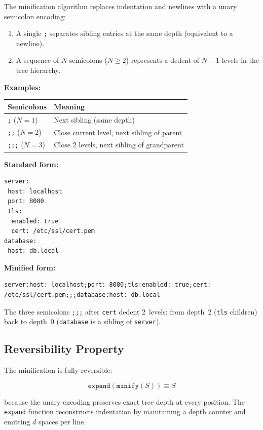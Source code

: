\documentclass[11pt, a4paper]{article}
\begin{document}
\noindent The minification algorithm replaces indentation and newlines with a
unary semicolon encoding:

\begin{enumerate}
\item A single \texttt{;} separates sibling entries at the same depth
      (equivalent to a newline).
\item A sequence of $N$ semicolons ($N \geq 2$) represents a dedent of
      $N-1$ levels in the tree hierarchy.
\end{enumerate}

\noindent \textbf{Examples:}

\begin{tabular}{ll}
\toprule
Semicolons & Meaning \\
\midrule
\texttt{;} ($N{=}1$)  & Next sibling (same depth) \\
\texttt{;;} ($N{=}2$) & Close current level, next sibling of parent \\
\texttt{;;;} ($N{=}3$) & Close 2 levels, next sibling of grandparent \\
\bottomrule
\end{tabular}

\medskip
\noindent \textbf{Standard form:}
\begin{lstlisting}[style=scon]
server:
 host: localhost
 port: 8080
 tls:
  enabled: true
  cert: /etc/ssl/cert.pem
database:
 host: db.local
\end{lstlisting}

\noindent \textbf{Minified form:}
\begin{lstlisting}[style=scon]
server:host: localhost;port: 8080;tls:enabled: true;cert: /etc/ssl/cert.pem;;;database:host: db.local
\end{lstlisting}

\noindent The three semicolons \texttt{;;;} after \texttt{cert} dedent
2~levels: from depth~2 (\texttt{tls} children) back to depth~0
(\texttt{database} is a sibling of \texttt{server}).

\subsection{Reversibility Property}

The minification is fully reversible:

$$\texttt{expand}(\texttt{minify}(S)) \equiv S$$

\noindent because the unary encoding preserves exact tree depth at every
position. The \texttt{expand} function reconstructs indentation by
maintaining a depth counter and emitting $d$ spaces per line.
\end{document}
